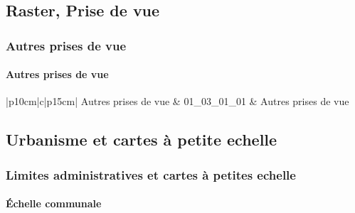 \documentclass[12pt,titlepage,oneside]{book}
\begin{document}

\subsection{Raster, Prise de vue}
\subsubsection{\large Autres prises de vue}
\paragraph{Autres prises de vue}
\noindent
\vspace{\baselineskip}

\renewcommand{\arraystretch}{1.2}
\begin{supertabular}{|p{10cm}|c|p{15cm}|}
 Autres prises de vue & 01\_03\_01\_01 & Autres prises de vue\\
\hline
\end{supertabular}
\subsection{Urbanisme et cartes à petite echelle}
\subsubsection{\large Limites administratives et cartes à petites echelle}
\paragraph{Échelle communale}
\noindent
\vspace{\baselineskip}
\end{document}

